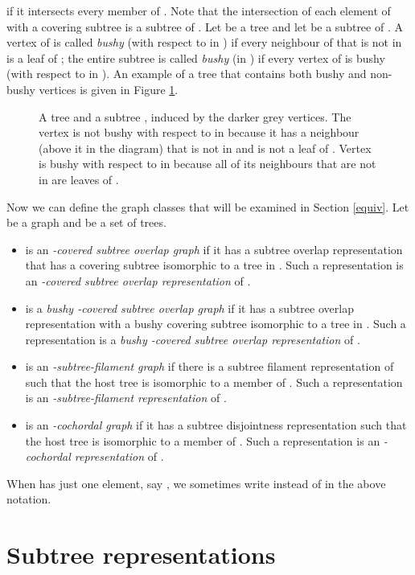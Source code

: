 \documentclass[
final
]{dmtcs-episciences}        \usepackage{graphics, amsthm, amsmath, amssymb, algorithm, algorithmic}
\begin{document}
if it intersects every member of . 
Note that the intersection of each element of  with a covering subtree  is a subtree of .
Let  be a tree and let  be a subtree of .
A vertex  of  is called {\em bushy} 
(with respect to  in )
if every neighbour of  that is not in  is a leaf of ; the entire subtree  is called {\em bushy} 
(in ) 
if every vertex of  is bushy
(with respect to  in ).  An example of a tree that contains both bushy and non-bushy vertices is given in Figure \ref{fig:bushinessExample}.
\begin{figure}
\begin{center}
\caption{A tree  and a subtree , induced by the darker grey vertices.  The vertex  is not bushy with respect to  in  because it has a neighbour (above it in the diagram) that is not in  and is not a leaf of .  Vertex  is bushy with respect to  in  because all of its neighbours that are not in  are leaves of . }
\label{fig:bushinessExample}
\end{center}
\end{figure}
Now we can define the graph classes that will be examined in Section \ref{equiv}.
Let  be a graph and  be a set of trees. 
\begin{itemize}
\item
 is an {\em -covered subtree overlap graph} if it has a subtree overlap representation that has a covering subtree isomorphic to a tree in .
Such a representation is an {\em -covered subtree overlap representation} of . 
\item
 is a {\em bushy -covered subtree overlap graph} if it has a subtree overlap representation with a bushy covering subtree isomorphic to a tree in .
Such a representation is a {\em bushy -covered subtree overlap representation} of . 
\item
 is an {\em -subtree-filament graph} if there is a subtree filament representation of  such that the host tree is isomorphic to a member of . Such a representation is an {\em -subtree-filament representation} of .
\item
 is an {\em -cochordal graph} if it 
has a subtree disjointness representation such that the host tree is isomorphic to a member of .
Such a representation is an {\em -cochordal representation} of . 
\end{itemize}
When  has just one element, say , we sometimes write  instead of  in the above notation.


\section{Subtree representations}
\end{document}
